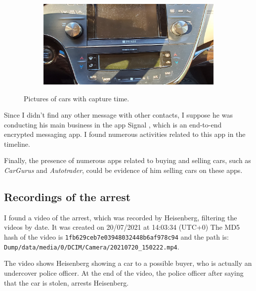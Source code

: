 \documentclass[12pt]{article}
\begin{document}
\begin{figure}[!ht]
    \hspace{2 pt}
    \begin{subfigure}[b]{0.4\textwidth}
        \centering
        \includegraphics[width=\textwidth]{images/car_photos/20210703_192907.jpg} %
        \caption{}
    \end{subfigure}
    \caption{Pictures of cars with capture time.}
    \label{fig:cars2}
\end{figure}


Since I didn't find any other message with other contacts, I suppose he was conducting his main business in the app Signal \cite{signal}, which is an end-to-end encrypted messaging app. I found numerous activities related to this app in the timeline.

Finally, the presence of numerous apps related to buying and selling cars, such as \textit{CarGurus} and \textit{Autotrader}, could be evidence of him selling cars on these apps.

\subsection{Recordings of the arrest}

I found a video of the arrest, which was recorded by Heisenberg, filtering the videos by date.
It was created on 20/07/2021 at 14:03:34 (UTC+0)
The MD5 hash of the video is \texttt{1fb629ceb7e03948032448b6af978c94} and the path is:\\
\texttt{Dump/data/media/0/DCIM/Camera/20210720\_150222.mp4}.

The video shows Heisenberg showing a car to a possible buyer, who is actually an undercover police officer. At the end of the video, the police officer after saying that the car is stolen, arrests Heisenberg.
\end{document}
